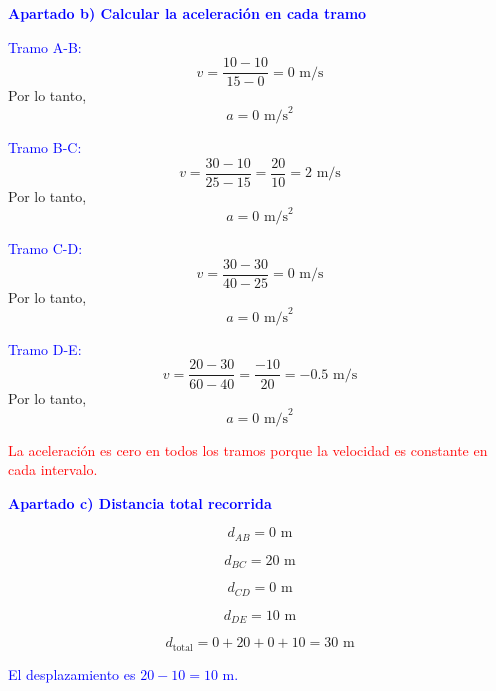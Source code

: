 \begin{exercise}
\begin{solu}
        \textbf{\textcolor{blue}{Apartado b) Calcular la aceleración en cada tramo}}

        \textcolor{blue}{Tramo A-B:}
        \[
        v=\frac{10-10}{15-0}=0\text{ m/s}
        \]
        Por lo tanto,
        \[
        \boxed{a=0\text{ m/s}^2}
        \]

        \textcolor{blue}{Tramo B-C:}
        \[
        v=\frac{30-10}{25-15}=\frac{20}{10}=2\text{ m/s}
        \]
        Por lo tanto,
        \[
        \boxed{a=0\text{ m/s}^2}
        \]

        \textcolor{blue}{Tramo C-D:}
        \[
        v=\frac{30-30}{40-25}=0\text{ m/s}
        \]
        Por lo tanto,
        \[
        \boxed{a=0\text{ m/s}^2}
        \]

        \textcolor{blue}{Tramo D-E:}
        \[
        v=\frac{20-30}{60-40}=\frac{-10}{20}=-0.5\text{ m/s}
        \]
        Por lo tanto,
        \[
        \boxed{a=0\text{ m/s}^2}
        \]

        \textcolor{red}{La aceleración es cero en todos los tramos porque la velocidad es constante en cada intervalo.}

        \vspace{0.5cm}

        \textbf{\textcolor{blue}{Apartado c) Distancia total recorrida}}

        \[
        d_{AB}=0\text{ m}
        \]

        \[
        d_{BC}=20\text{ m}
        \]

        \[
        d_{CD}=0\text{ m}
        \]

        \[
        d_{DE}=10\text{ m}
        \]

        \[
        d_{\text{total}}=0+20+0+10=\boxed{30\text{ m}}
        \]

        \textcolor{blue}{El desplazamiento es $20-10=10$ m.}
    \end{solu}
\end{exercise}

